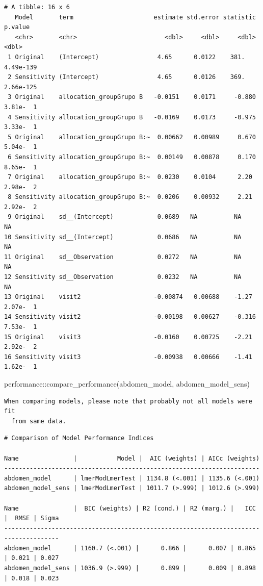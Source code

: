 \documentclass[
  letterpaper,
  DIV=11,
  numbers=noendperiod]{scrartcl}
\newenvironment{Shaded}{\begin{snugshade}}{\end{snugshade}}
\newcommand{\FunctionTok}[1]{\textcolor[rgb]{0.28,0.35,0.67}{#1}}
\newcommand{\NormalTok}[1]{\textcolor[rgb]{0.00,0.23,0.31}{#1}}
\newcommand{\SpecialCharTok}[1]{\textcolor[rgb]{0.37,0.37,0.37}{#1}}
\begin{document}
\begin{verbatim}
# A tibble: 16 x 6
   Model       term                      estimate std.error statistic    p.value
   <chr>       <chr>                        <dbl>     <dbl>     <dbl>      <dbl>
 1 Original    (Intercept)                4.65      0.0122    381.     4.49e-139
 2 Sensitivity (Intercept)                4.65      0.0126    369.     2.66e-125
 3 Original    allocation_groupGrupo B   -0.0151    0.0171     -0.880  3.81e-  1
 4 Sensitivity allocation_groupGrupo B   -0.0169    0.0173     -0.975  3.33e-  1
 5 Original    allocation_groupGrupo B:~  0.00662   0.00989     0.670  5.04e-  1
 6 Sensitivity allocation_groupGrupo B:~  0.00149   0.00878     0.170  8.65e-  1
 7 Original    allocation_groupGrupo B:~  0.0230    0.0104      2.20   2.98e-  2
 8 Sensitivity allocation_groupGrupo B:~  0.0206    0.00932     2.21   2.92e-  2
 9 Original    sd__(Intercept)            0.0689   NA          NA     NA        
10 Sensitivity sd__(Intercept)            0.0686   NA          NA     NA        
11 Original    sd__Observation            0.0272   NA          NA     NA        
12 Sensitivity sd__Observation            0.0232   NA          NA     NA        
13 Original    visit2                    -0.00874   0.00688    -1.27   2.07e-  1
14 Sensitivity visit2                    -0.00198   0.00627    -0.316  7.53e-  1
15 Original    visit3                    -0.0160    0.00725    -2.21   2.92e-  2
16 Sensitivity visit3                    -0.00938   0.00666    -1.41   1.62e-  1
\end{verbatim}

\begin{Shaded}
\begin{Highlighting}[]
\NormalTok{performance}\SpecialCharTok{::}\FunctionTok{compare\_performance}\NormalTok{(abdomen\_model, abdomen\_model\_sens)}
\end{Highlighting}
\end{Shaded}

\begin{verbatim}
When comparing models, please note that probably not all models were fit
  from same data.
\end{verbatim}

\begin{verbatim}
# Comparison of Model Performance Indices

Name               |           Model |  AIC (weights) | AICc (weights)
----------------------------------------------------------------------
abdomen_model      | lmerModLmerTest | 1134.8 (<.001) | 1135.6 (<.001)
abdomen_model_sens | lmerModLmerTest | 1011.7 (>.999) | 1012.6 (>.999)

Name               |  BIC (weights) | R2 (cond.) | R2 (marg.) |   ICC |  RMSE | Sigma
-------------------------------------------------------------------------------------
abdomen_model      | 1160.7 (<.001) |      0.866 |      0.007 | 0.865 | 0.021 | 0.027
abdomen_model_sens | 1036.9 (>.999) |      0.899 |      0.009 | 0.898 | 0.018 | 0.023
\end{verbatim}
\end{document}
